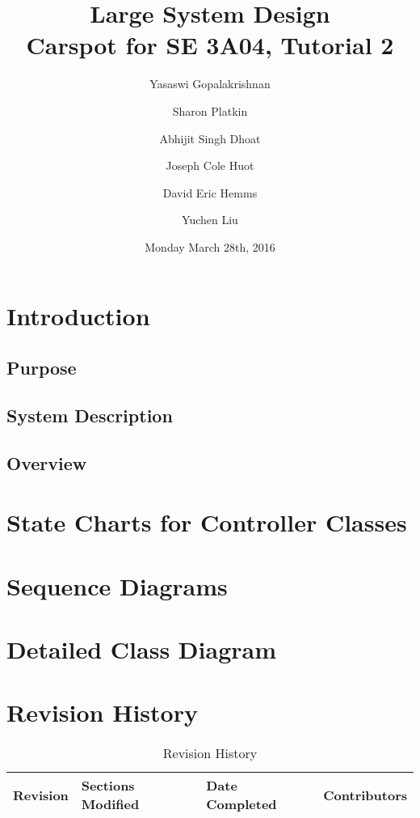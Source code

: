 \documentclass[12pt]{article}
\title{Large System Design\\
	\large Carspot for SE 3A04, Tutorial 2}
\author{
         Yasaswi Gopalakrishnan\\ \newline
         \and
         Sharon Platkin \\ \newline
         \and
         Abhijit Singh Dhoat\\ \newline
         \and
         Joseph Cole Huot\\ \newline
         \and
         David Eric Hemms\\ \newline
         \and
         Yuchen Liu\\ \newline
    }
\date{Monday March 28th, 2016}
\begin{document}
\maketitle
\newpage
\tableofcontents
\listoftables
\newpage

\section{Introduction}
\subsection{Purpose}
\subsection{System Description}
\subsection{Overview}

\section{State Charts for Controller Classes}
\section{Sequence Diagrams}
\section{Detailed Class Diagram}

\newpage
\FloatBarrier
\appendix
\section{Revision History}
\begin{table}[ht]
	\centering
	\begin{tabular}{|p{2cm}|p{5cm}|p{3cm}|p{3cm}|}
		\hline
		\textbf{Revision} & \textbf{Sections Modified} & \textbf{Date Completed} & \textbf{Contributors}\\
		\hline
	\end{tabular}
	\caption{Revision History}
	\label{table:1}
\end{table}
\end{document}
